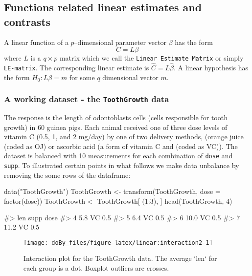 \hypertarget{functions-related-linear-estimates-and-contrasts}{%
\subsection{Functions related linear estimates and
contrasts}\label{functions-related-linear-estimates-and-contrasts}}

A linear function of a \(p\)--dimensional parameter vector \(\beta\) has
the form \begin{displaymath}
  C=L\beta
\end{displaymath} where \(L\) is a \(q\times p\) matrix which we call
the \texttt{Linear\ Estimate\ Matrix} or simply \texttt{LE-matrix}. The
corresponding linear estimate is \(\hat C = L \hat \beta\). A linear
hypothesis has the form \(H_0: L\beta=m\) for some \(q\) dimensional
vector \(m\).

\hypertarget{a-working-dataset---the-toothgrowth-data}{%
\subsubsection{\texorpdfstring{A working dataset - the
\texttt{ToothGrowth}
data}{A working dataset - the ToothGrowth data}}\label{a-working-dataset---the-toothgrowth-data}}

The response is the length of odontoblasts cells (cells responsible for
tooth growth) in 60 guinea pigs. Each animal received one of three dose
levels of vitamin C (0.5, 1, and 2 mg/day) by one of two delivery
methods, (orange juice (coded as OJ) or ascorbic acid (a form of vitamin
C and (coded as VC)). The dataset is balanced with 10 measurements for
each combination of \texttt{dose} and \texttt{supp}. To illustrated
certain points in what follows we make data unbalance by removing the
some rows of the dataframe:

\begin{Schunk}
\begin{Sinput}
data("ToothGrowth")
ToothGrowth <- transform(ToothGrowth, dose = factor(dose))
ToothGrowth <- ToothGrowth[-(1:3), ]
head(ToothGrowth, 4)
\end{Sinput}
\begin{Soutput}
#>    len supp dose
#> 4  5.8   VC  0.5
#> 5  6.4   VC  0.5
#> 6 10.0   VC  0.5
#> 7 11.2   VC  0.5
\end{Soutput}
\end{Schunk}

\begin{Schunk}
\begin{figure}
\texttt{[image: doBy\_files/figure-latex/linear:interaction2-1]} \caption[Interaction plot for the ToothGrowth data]{Interaction plot for the ToothGrowth data. The average `len` for each group is a dot. Boxplot outliers are crosses.}\label{fig:linear:interaction2}
\end{figure}
\end{Schunk}

